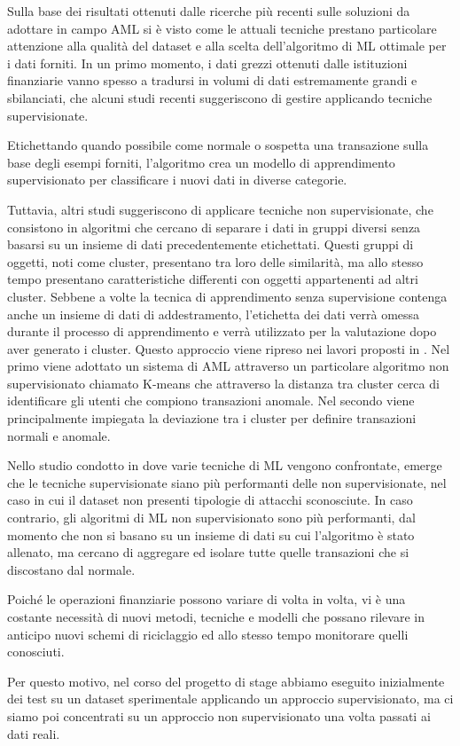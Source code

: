 Sulla base dei risultati ottenuti dalle ricerche più recenti sulle soluzioni da adottare in campo AML si è visto come le attuali tecniche prestano particolare attenzione alla qualità del dataset e alla scelta dell'algoritmo di ML ottimale per i dati forniti.
In un primo momento, i dati grezzi ottenuti dalle istituzioni finanziarie vanno spesso a tradursi in volumi di dati estremamente grandi e sbilanciati, che alcuni studi recenti suggeriscono di gestire applicando tecniche supervisionate. 

Etichettando quando possibile come normale o sospetta una transazione sulla base degli esempi forniti, l'algoritmo crea un modello di apprendimento supervisionato per classificare i nuovi dati in diverse categorie.

Tuttavia, altri studi suggeriscono di applicare tecniche non supervisionate, che consistono in algoritmi che cercano di separare i dati in gruppi diversi senza basarsi su un insieme di dati precedentemente etichettati. Questi gruppi di oggetti, noti come cluster, presentano tra loro delle similarità, ma allo stesso tempo presentano caratteristiche differenti con oggetti appartenenti ad altri cluster.
Sebbene a volte la tecnica di apprendimento senza supervisione contenga anche un insieme di dati di addestramento, l'etichetta dei dati verrà omessa durante il processo di apprendimento e verrà utilizzato per la valutazione dopo aver generato i cluster. 
Questo approccio viene ripreso nei lavori proposti in \citep{le2010application, larik2011clustering}. Nel primo viene adottato un sistema di AML attraverso un particolare algoritmo non supervisionato chiamato K-means che attraverso la distanza tra cluster cerca di identificare gli utenti che compiono transazioni anomale. Nel secondo viene principalmente impiegata la deviazione tra i cluster per definire transazioni normali e anomale.

Nello studio condotto in \citep{omar2013machine} dove varie tecniche di ML vengono confrontate, emerge che le tecniche supervisionate siano più performanti delle non supervisionate, nel caso in cui il dataset non presenti tipologie di attacchi sconosciute. In caso contrario, gli algoritmi di ML non supervisionato sono più performanti, dal momento che non si basano su un insieme di dati su cui l'algoritmo è stato allenato, ma cercano di aggregare ed isolare tutte quelle transazioni che si discostano dal normale.

Poiché le operazioni finanziarie possono variare di volta in volta, vi è una costante necessità di nuovi metodi, tecniche e modelli che possano rilevare in anticipo nuovi schemi di riciclaggio ed allo stesso tempo monitorare quelli conosciuti. 

Per questo motivo, nel corso del progetto di stage abbiamo eseguito inizialmente dei test su un dataset sperimentale applicando un approccio supervisionato, ma ci siamo poi concentrati su un approccio non supervisionato una volta passati ai dati reali.





